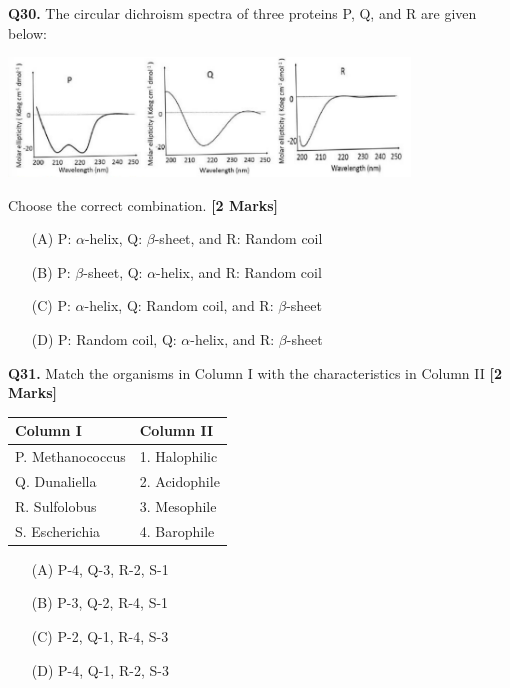 \documentclass[11pt]{article}
\newcommand{\questionb}[2]{
    \noindent\textbf{Q#2.} #1 \hfill \textbf{[2 Marks]}
}
\begin{document}
\vspace{0.5cm}

\questionb{The circular dichroism spectra of three proteins P, Q, and R are given below:

\begin{center}
\includegraphics[width=0.8\textwidth]{figures/30.png}
\end{center}

Choose the correct combination.}{30}
\begin{enumerate}
    \item[(A)] P: $\alpha$-helix, Q: $\beta$-sheet, and R: Random coil
    \item[(B)] P: $\beta$-sheet, Q: $\alpha$-helix, and R: Random coil  
    \item[(C)] P: $\alpha$-helix, Q: Random coil, and R: $\beta$-sheet
    \item[(D)] P: Random coil, Q: $\alpha$-helix, and R: $\beta$-sheet
\end{enumerate}

\vspace{0.5cm}

\questionb{Match the organisms in Column I with the characteristics in Column II}{31}

\begin{tabularx}{\linewidth}{|l|X|}
\hline
\textbf{Column I} & \textbf{Column II} \\
\hline
P. Methanococcus & 1. Halophilic \\
Q. Dunaliella & 2. Acidophile \\
R. Sulfolobus & 3. Mesophile \\
S. Escherichia & 4. Barophile \\
\hline
\end{tabularx}

\begin{enumerate}
    \item[(A)] P-4, Q-3, R-2, S-1
    \item[(B)] P-3, Q-2, R-4, S-1  
    \item[(C)] P-2, Q-1, R-4, S-3
    \item[(D)] P-4, Q-1, R-2, S-3
\end{enumerate}
\end{document}
